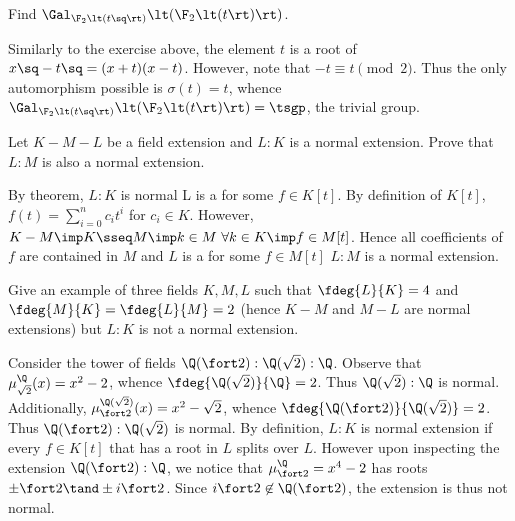 \documentclass{article}
\begin{document}
\begin{subexercise}
  Find \( \Gal_{\F_2\lt(t\sq\rt)}\lt(\F_2\lt(t\rt)\rt) \).
\end{subexercise}
\begin{solution}
  Similarly to the exercise above, the element \( t \) is a root of \( x\sq-t\sq = (x+t)(x-t) \).
  However, note that \( -t \equiv t \pmod 2 \).
  Thus the only automorphism possible is \( \sigma(t) = t \), whence \( \Gal_{\F_2\lt(t\sq\rt)}\lt(\F_2\lt(t\rt)\rt) = \tsgp \), the trivial group.
\end{solution}

\begin{subexercise}
  Let \( K - M - L \) be a field extension and \( L:K \) is a normal extension.
  Prove that \( L:M \) is also a normal extension.
\end{subexercise}
\begin{solution}
By theorem, \( L:K \) is normal \iff L is a \sf for some \( f\in K[t] \).
By definition of \( K[t] \), \( f(t)=\sum\limits_{i=0}^n c_it^i \) for \( c_i\in K \).
However, \( K-M\imp K\sseq M \imp k\in M \ \forall k\in K \imp f\in M[t] \).
Hence all coefficients of \( f \) are contained in \( M \) and \( L \) is a \sf for some \( f\in M[t] \) \iff \( L:M \) is a normal extension.
\end{solution}

\begin{subexercise}
  Give an example of three fields \( K, M, L \) such that \( \fdeg{L}{K} = 4 \) and \( \fdeg{M}{K} = \fdeg{L}{M} = 2 \) (hence \( K-M \) and \( M-L \) are normal extensions) but \( L : K \) is not a normal extension.
\end{subexercise}
\begin{solution}
Consider the tower of fields \( \Q(\fort 2):\Q(\sqrt 2):\Q \).
Observe that \( \mu_{\sqrt 2}^\Q(x) = x^2-2 \), whence \( \fdeg{\Q(\sqrt 2)}{\Q} = 2 \).
Thus \( \Q(\sqrt 2):\Q \) is normal.
Additionally, \( \mu_{\fort 2}^{\Q(\sqrt 2)}(x) = x^2-\sqrt 2 \), whence \( \fdeg{\Q(\fort 2)}{\Q(\sqrt 2)} = 2 \).
Thus \( \Q(\fort 2):\Q(\sqrt 2) \) is normal.
By definition, \( L:K \) is normal extension if every \( f\in K[t] \) that has a root in \( L \) splits over \( L \).
However upon inspecting the extension \( \Q(\fort 2):\Q \), we notice that \( \mu_{\fort 2}^\Q = x^4-2 \) has roots \( \pm\fort 2 \tand \pm i\fort 2 \).
Since \( i\fort 2 \not\in \Q(\fort 2) \), the extension is thus not normal.
\end{solution}
\end{document}
